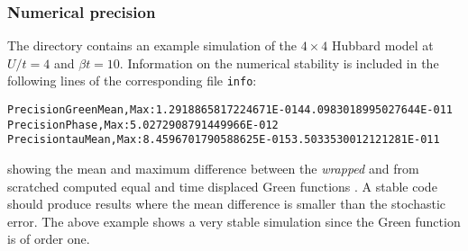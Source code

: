 \documentclass{SciPost}
\begin{document}
\subsubsection{Numerical precision}\label{sec:prec_charge}
%
The directory   contains an example simulation of the $4 \times 4$ Hubbard model at $U/t=4$ and $\beta t = 10$. 
Information on the numerical stability is included in the following lines of the corresponding file \texttt{info}:
\begin{alltt}
Precision Green  Mean, Max : 1.2918865817224671E-014  4.0983018995027644E-011
Precision Phase, Max       : 5.0272908791449966E-012
Precision tau    Mean, Max : 8.4596701790588625E-015  3.5033530012121281E-011
\end{alltt}
showing the mean and maximum difference between the \textit{wrapped}  and from scratched computed equal and time displaced  Green functions \cite{Assaad08_rev}.
A stable code  should produce results where the mean difference is smaller than the  stochastic error. The above example  shows a very stable  simulation since the Green function  is of order one. 

%
\end{document}
